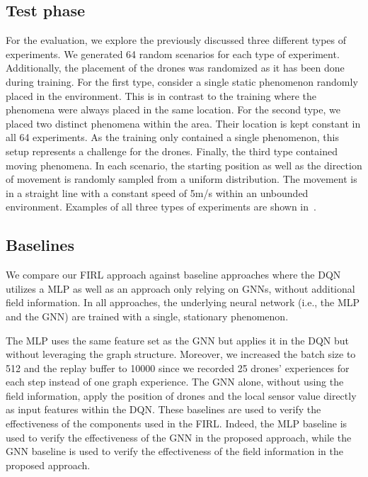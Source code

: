 \subsection{Test phase}
For the evaluation, 
 we explore the previously discussed three different types of experiments.
%
We generated 64 random scenarios for each type of experiment. 
 Additionally, the placement of the drones was randomized as it has been done during training.
For the first type, consider a single static phenomenon randomly placed in the environment. 
This is in contrast to the training where the phenomena were always placed in the same location.  
For the second type, we placed two distinct phenomena within the area. 
Their location is kept constant in all 64 experiments. 
As the training only contained a single phenomenon, 
this setup represents a challenge for the drones.
Finally, the third type contained moving phenomena. 
In each scenario, the starting position as well as the direction of movement is randomly sampled from a uniform distribution. 
The movement is in a straight line with a constant speed of 5m/s within an unbounded environment. 
%
Examples of all three types of experiments are shown in~. 

\subsection{Baselines}
We compare our \ac{FIRL} approach against baseline approaches where the \ac{DQN} utilizes a \ac{MLP} as well as an approach only relying on \acp{GNN}, without additional field information. 
%
In all approaches, the underlying neural network (i.e., the \ac{MLP} and the \ac{GNN}) are trained 
with a single, stationary phenomenon.
%

The \ac{MLP} uses the same feature set as the \ac{GNN} but applies it in the \ac{DQN} but 
without leveraging the graph structure. Moreover, we increased the batch size to 512 and the replay buffer to 10000 since we recorded 25 drones' experiences for each step instead of one graph experience.
%
The \ac{GNN} alone, without using the field information, apply the position of drones and the local sensor value directly as input features within the \ac{DQN}.
%
These baselines are used to verify the effectiveness of the components used in the FIRL. 
%
Indeed, the \ac{MLP} baseline is used to verify the effectiveness of the \ac{GNN} in the proposed approach, while the \ac{GNN} baseline is used to verify the effectiveness of the field information in the proposed approach.
